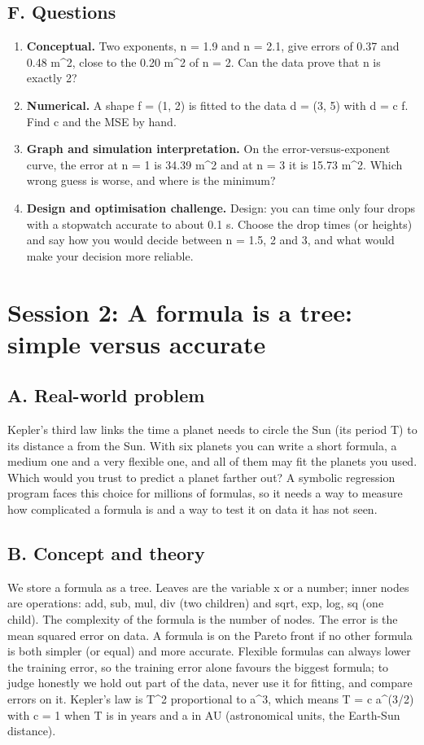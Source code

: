 \documentclass[11pt,a4paper]{article}
\begin{document}
\subsection*{F. Questions}
\begin{enumerate}[nosep]
\item \textbf{Conceptual.} Two exponents, n = 1.9 and n = 2.1, give errors of 0.37 and 0.48 m\textasciicircum{}2, close to the 0.20 m\textasciicircum{}2 of n = 2. Can the data prove that n is exactly 2?
\item \textbf{Numerical.} A shape f = (1, 2) is fitted to the data d = (3, 5) with d = c f. Find c and the MSE by hand.
\item \textbf{Graph and simulation interpretation.} On the error-versus-exponent curve, the error at n = 1 is 34.39 m\textasciicircum{}2 and at n = 3 it is 15.73 m\textasciicircum{}2. Which wrong guess is worse, and where is the minimum?
\item \textbf{Design and optimisation challenge.} Design: you can time only four drops with a stopwatch accurate to about 0.1 s. Choose the drop times (or heights) and say how you would decide between n = 1.5, 2 and 3, and what would make your decision more reliable.
\end{enumerate}

\section{Session 2: A formula is a tree: simple versus accurate}

\subsection*{A. Real-world problem}
Kepler's third law links the time a planet needs to circle the Sun (its period T) to its distance a from the Sun. With six planets you can write a short formula, a medium one and a very flexible one, and all of them may fit the planets you used. Which would you trust to predict a planet farther out? A symbolic regression program faces this choice for millions of formulas, so it needs a way to measure how complicated a formula is and a way to test it on data it has not seen.

\subsection*{B. Concept and theory}
We store a formula as a tree. Leaves are the variable x or a number; inner nodes are operations: add, sub, mul, div (two children) and sqrt, exp, log, sq (one child). The complexity of the formula is the number of nodes. The error is the mean squared error on data. A formula is on the Pareto front if no other formula is both simpler (or equal) and more accurate. Flexible formulas can always lower the training error, so the training error alone favours the biggest formula; to judge honestly we hold out part of the data, never use it for fitting, and compare errors on it. Kepler's law is T\textasciicircum{}2 proportional to a\textasciicircum{}3, which means T = c a\textasciicircum{}(3/2) with c = 1 when T is in years and a in AU (astronomical units, the Earth-Sun distance).
\end{document}
